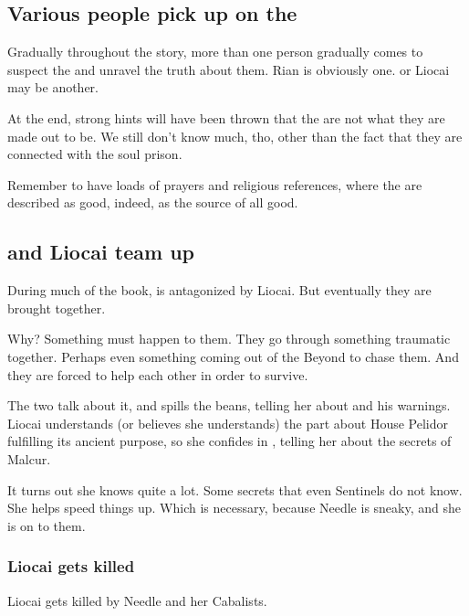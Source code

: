\begin{garbage}
\subsection{Various people pick up on the \Sephiroth}
Gradually throughout the story, more than one person gradually comes to suspect the \Sephiroth{} and unravel the truth about them. Rian is obviously one. \Tiroco{} or Liocai may be another. 

At the end, strong hints will have been thrown that the \Sephiroth{} are not what they are made out to be. We still don't know much, tho, other than the fact that they are connected with the soul prison. 

Remember to have loads of prayers and religious references, where the \Sephiroth{} are described as good, indeed, as the source of all good. 








\subsection{\Tiroco{} and Liocai team up}
During much of the book, \Tiroco{} is antagonized by Liocai. But eventually they are brought together. 

Why? Something must happen to them. They go through something traumatic together. Perhaps even something coming out of the Beyond to chase them. And they are forced to help each other in order to survive.

The two \sphyles{} talk about it, and \Tiroco{} spills the beans, telling her about \Psyrex{} and his warnings. Liocai understands (or believes she understands) the part about House Pelidor fulfilling its ancient purpose, so she confides in \Tiroco, telling her about the secrets of Malcur. 

It turns out she knows quite a lot. Some secrets that even Sentinels do not know. She helps speed things up. Which is necessary, because Needle is sneaky, and she is on to them.





\subsubsection{Liocai gets killed}
Liocai gets killed by Needle and her Cabalists. 


\end{garbage}
